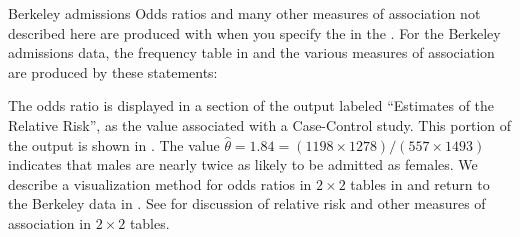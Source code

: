 \begin{Example}[berkeley1a]{Berkeley admissions}
Odds ratios and many other measures of association not described here
are produced with  when you specify the 
in the .
For the Berkeley admissions data, the frequency table in  and the various measures of association
are produced by these statements:

\begin{Output}[htb]
\caption{Admission to Berkeley graduate programs: Odds ratio and relative risk}\label{out:berkfreq.2}
\small

\end{Output}
The odds ratio is displayed in a section of the output labeled
``Estimates of the Relative Risk'', as the value associated
with a Case-Control study.  This portion of the output is shown in
.
The value $\hat{\theta} = 1.84 = (1198 \times 1278) / (557 \times 1493)$ indicates that males are nearly
twice as likely to be admitted as females.
We describe a visualization method for odds ratios in $2 \times 2$
tables in 
and return to the Berkeley data in .
See  for discussion of relative risk and other
measures of association in $2 \times 2$ tables.
\end{Example}
